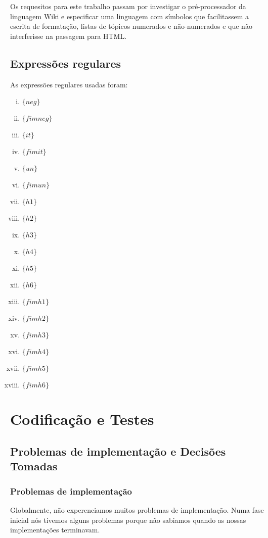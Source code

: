 \documentclass{report}
\begin{document}
Os requesitos para este trabalho passam por investigar o pré-processador da linguagem Wiki e especificar uma linguagem com símbolos que facilitassem a escrita de formatação, listas de tópicos numerados e não-numerados e que não interferisse na passagem para HTML.
 
\section{Expressões regulares} 

As expressões regulares usadas foram:

\begin{enumerate}[i)]
\item $ \{$$neg$$\} $
\item $ \{$$fimneg$$\} $
\item $ \{$$it$$\} $
\item $ \{$$fimit$$\} $
\item $ \{$$un$$\} $
\item $ \{$$fimun$$\} $
\item $ \{$$h1$$\} $
\item $ \{$$h2$$\} $
\item $ \{$$h3$$\} $
\item $ \{$$h4$$\} $
\item $ \{$$h5$$\} $
\item $ \{$$h6$$\} $
\item $ \{$$fimh1$$\} $
\item $ \{$$fimh2$$\} $
\item $ \{$$fimh3$$\} $
\item $ \{$$fimh4$$\} $
\item $ \{$$fimh5$$\} $
\item $ \{$$fimh6$$\} $


\end{enumerate}

\chapter{Codificação e Testes}
\section{Problemas de implementação e Decisões Tomadas}
\subsection{Problemas de implementação}

Globalmente, não experenciamos muitos problemas de implementação. Numa fase inicial nós tivemos alguns problemas porque não sabiamos quando as nossas implementações terminavam.   
\end{document}
